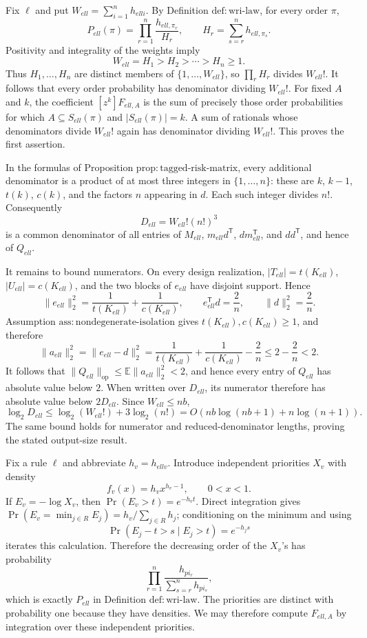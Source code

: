 Fix \(\ell\) and put \(W_{ell}=\sum_{i=1}^n h_{ell i}\).  By Definition \(\mathrm{def:wri\mbox{-}law}\), for every order \(\pi\),
\[
 P_{ell}(\pi)
 =\prod_{r=1}^n
 \frac{h_{ell,\pi_r}}{H_r},
 \qquad
 H_r=\sum_{s=r}^n h_{ell,\pi_s}.
\]
Positivity and integrality of the weights imply
\[
 W_{ell}=H_1>H_2>\cdots>H_n\ge1.
\]
Thus \(H_1,\ldots,H_n\) are distinct members of \(\{1,\ldots,W_{ell}\}\), so \(\prod_rH_r\) divides \(W_{ell}!\).  It follows that every order probability has denominator dividing \(W_{ell}!\).  For fixed \(A\) and \(k\), the coefficient \([z^k]F_{ell,A}\) is the sum of precisely those order probabilities for which \(A\subseteq S_{ell}(\pi)\) and \(|S_{ell}(\pi)|=k\).  A sum of rationals whose denominators divide \(W_{ell}!\) again has denominator dividing \(W_{ell}!\).  This proves the first assertion.

In the formulas of Proposition \(\mathrm{prop:tagged\mbox{-}risk\mbox{-}matrix}\), every additional denominator is a product of at most three integers in \(\{1,\ldots,n\}\): these are \(k\), \(k-1\), \(t(k)\), \(c(k)\), and the factors \(n\) appearing in \(d\).  Each such integer divides \(n!\).  Consequently
\[
 D_{ell}=W_{ell}!(n!)^3
\]
is a common denominator of all entries of \(M_{ell}\), \(m_{ell}d^{\mathsf T}\), \(dm_{ell}^{\mathsf T}\), and \(dd^{\mathsf T}\), and hence of \(Q_{ell}\).

It remains to bound numerators.  On every design realization, \(|T_{ell}|=t(K_{ell})\), \(|U_{ell}|=c(K_{ell})\), and the two blocks of \(e_{ell}\) have disjoint support.  Hence
\[
 \|e_{ell}\|_2^2=\frac1{t(K_{ell})}+\frac1{c(K_{ell})},
 \qquad
 e_{ell}^{\mathsf T}d=\frac2n,
 \qquad
 \|d\|_2^2=\frac2n.
\]
Assumption \(\mathrm{ass:nondegenerate\mbox{-}isolation}\) gives \(t(K_{ell}),c(K_{ell})\ge1\), and therefore
\[
 \|a_{ell}\|_2^2
 =\|e_{ell}-d\|_2^2
 =\frac1{t(K_{ell})}+\frac1{c(K_{ell})}-\frac2n
 \le 2-\frac2n<2.
\]
It follows that \(\|Q_{ell}\|_{\mathrm{op}}\le\mathbb E\|a_{ell}\|_2^2<2\), and hence every entry of \(Q_{ell}\) has absolute value below \(2\).  When written over \(D_{ell}\), its numerator therefore has absolute value below \(2D_{ell}\).  Since \(W_{ell}\le nb\),
\[
 \log_2 D_{ell}
 \le \log_2(W_{ell}!)+3\log_2(n!)
 =O\!\left(nb\log(nb+1)+n\log(n+1)\right).
\]
The same bound holds for numerator and reduced-denominator lengths, proving the stated output-size result.

Fix a rule \(\ell\) and abbreviate \(h_v=h_{ell v}\).  Introduce independent priorities \(X_v\) with density
\[
 f_v(x)=h_vx^{h_v-1},\qquad 0<x<1.
\]
If \(E_v=-\log X_v\), then \(\Pr(E_v>t)=e^{-h_vt}\).  Direct integration gives \(\Pr(E_v=\min_{j\in R}E_j)=h_v/\sum_{j\in R}h_j\); conditioning on the minimum and using
\[
 \Pr(E_j-t>s\mid E_j>t)=e^{-h_js}
\]
iterates this calculation.  Therefore the decreasing order of the \(X_v\)'s has probability
\[
 \prod_{r=1}^n\frac{h_{pi_r}}{\sum_{s=r}^nh_{pi_s}},
\]
which is exactly \(P_{ell}\) in Definition \(\mathrm{def:wri\mbox{-}law}\).  The priorities are distinct with probability one because they have densities.  We may therefore compute \(F_{ell,A}\) by integration over these independent priorities.

